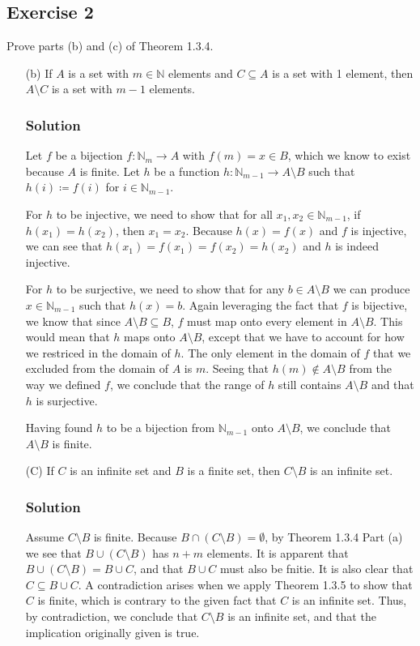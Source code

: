 \documentclass[12pt]{article}
\begin{document}
\subsection*{Exercise 2}
Prove parts (b) and (c) of Theorem 1.3.4.
\begin{itemize}
\item[(b)] If $A$ is a set with $m \in \mathbb{N}$ elements and $C \subseteq A$ is a set with 1 element, then $A \setminus C$ is a set with $m - 1$ elements.
\subsubsection*{Solution}
Let $f$ be a bijection $f : \mathbb{N}_m \to A$ with $f(m) = x \in B$, which we know to exist because $A$ is finite.
Let $h$ be a function $h : \mathbb{N}_{m-1} \to A \setminus B$ such that $h(i) \coloneqq f(i)$ for $i \in \mathbb{N}_{m - 1}$.

For $h$ to be injective, we need to show that for all $x_1, x_2 \in \mathbb{N}_{m-1}$, if $h\left(x_1\right) = h\left(x_2\right)$, then $x_1 = x_2$. Because $h(x) = f(x)$ and $f$ is injective, we can see that $h\left(x_1\right) = f\left(x_1\right) = f\left(x_2\right) = h\left(x_2\right)$ and $h$ is indeed injective.

For $h$ to be surjective, we need to show that for any $b \in A \setminus B$ we can produce $x \in \mathbb{N}_{m-1}$ such that $h\left(x\right) = b$. Again leveraging the fact that $f$ is bijective, we know that since $A \setminus B \subseteq B$, $f$ must map onto every element in $A \setminus B$. This would mean that $h$ maps onto $A \setminus B$, except that we have to account for how we restriced in the domain of $h$. The only element in the domain of $f$ that we excluded from the domain of $A$ is $m$. Seeing that $h\left(m\right) \notin A \setminus B$ from the way we defined $f$, we conclude that the range of $h$ still contains $A \setminus B$ and that $h$ is surjective.

Having found $h$ to be a bijection from $\mathbb{N}_{m-1}$ onto $A \setminus B$, we conclude that $A \setminus B$ is finite.

\item[(C)] If $C$ is an infinite set and $B$ is a finite set, then $C \setminus B$ is an infinite set.
\subsubsection*{Solution}
Assume $C \setminus B$ is finite. Because $B \cap \left(C \setminus B\right) = \emptyset$, by Theorem 1.3.4 Part (a) we see that $B \cup \left(C \setminus B\right)$ has $n + m$ elements. It is apparent that $B \cup \left(C \setminus B\right) = B \cup C$, and that $B \cup C$ must also be fnitie. It is also clear that $C \subseteq B \cup C$. A contradiction arises when we apply Theorem 1.3.5 to show that $C$ is finite, which is contrary to the given fact that $C$ is an infinite set. Thus, by contradiction, we conclude that $C \setminus B$ is an infinite set, and that the implication originally given is true.

\end{itemize}
\end{document}

